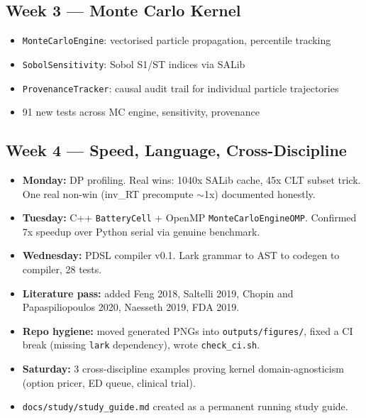 \documentclass[11pt]{article}
\begin{document}
\subsection*{Week 3 --- Monte Carlo Kernel}
\begin{itemize}[leftmargin=*]
  \item \texttt{MonteCarloEngine}: vectorised particle propagation,
    percentile tracking
  \item \texttt{SobolSensitivity}: Sobol S1/ST indices via SALib
  \item \texttt{ProvenanceTracker}: causal audit trail for individual
    particle trajectories
  \item 91 new tests across MC engine, sensitivity, provenance
\end{itemize}

\subsection*{Week 4 --- Speed, Language, Cross-Discipline}
\begin{itemize}[leftmargin=*]
  \item \textbf{Monday:} DP profiling. Real wins: 1040x SALib cache, 45x
    CLT subset trick. One real non-win (inv\_RT precompute $\sim$1x)
    documented honestly.
  \item \textbf{Tuesday:} C++ \texttt{BatteryCell} + OpenMP
    \texttt{MonteCarloEngineOMP}. Confirmed 7x speedup over Python
    serial via genuine benchmark.
  \item \textbf{Wednesday:} PDSL compiler v0.1. Lark grammar to AST to
    codegen to compiler, 28 tests.
  \item \textbf{Literature pass:} added Feng 2018, Saltelli 2019, Chopin
    and Papaspiliopoulos 2020, Naesseth 2019, FDA 2019.
  \item \textbf{Repo hygiene:} moved generated PNGs into
    \texttt{outputs/figures/}, fixed a CI break (missing \texttt{lark}
    dependency), wrote \texttt{check\_ci.sh}.
  \item \textbf{Saturday:} 3 cross-discipline examples proving kernel
    domain-agnosticism (option pricer, ED queue, clinical trial).
  \item \texttt{docs/study/study\_guide.md} created as a permanent
    running study guide.
\end{itemize}
\end{document}
